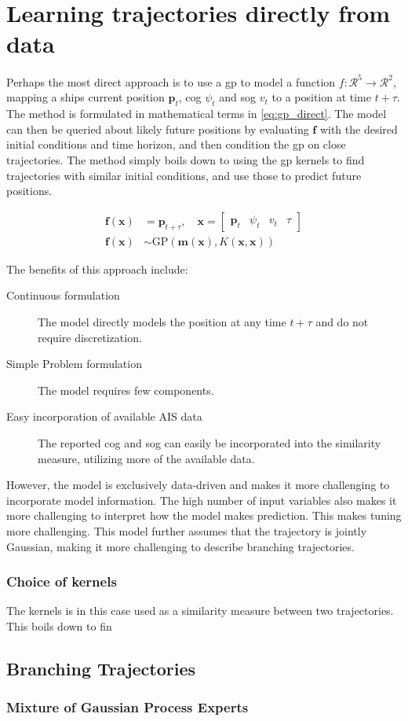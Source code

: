 \chapter{Learning trajectories directly from data}
Perhaps the most direct approach is to use a \acrshort{gp} to model a function $f: \mathcal{R}^5 \to \mathcal{R}^2$, mapping a ships current position $\boldsymbol{p}_t$, \acrshort{cog} $\psi_t$ and \acrshort{sog} $v_t$ to a position at time $t+\tau$. The method is formulated in mathematical terms in \cref{eq:gp_direct}. The model can then be queried about likely future positions by evaluating $\boldsymbol{f}$ with the desired initial conditions and time horizon, and then condition the \acrshort{gp} on close trajectories. 
The method simply boils down to using the \acrshort{gp} kernels to find trajectories with similar initial conditions, and use those to predict future positions.

\begin{subequations}\label{eq:gp_direct}
\begin{align}
    \boldsymbol{f}(\boldsymbol{x}) &= \boldsymbol{p}_{t+\tau} \label{eq:gp_direct_f}, \quad \boldsymbol{x} = \begin{bmatrix} \boldsymbol{p}_t & \psi_t & v_t & \tau\end{bmatrix}\\
    \boldsymbol{f}(\boldsymbol{x}) &\sim \text{GP}(\boldsymbol{m}(\boldsymbol{x}), K(\boldsymbol{x}, \boldsymbol{x}))\label{eq:gp_direct_f_dist}
\end{align} 
\end{subequations}

The benefits of this approach include:
\begin{description}
    \item[Continuous formulation] The model directly models the position at any time $t+\tau$ and do not require discretization. 
    \item[Simple Problem formulation] The model requires few components.
    \item[Easy incorporation of available AIS data] The reported \acrshort{cog} and \acrshort{sog} can easily be incorporated into the similarity measure, utilizing more of the available data.
\end{description}

However, the model is exclusively data-driven and makes it more challenging to incorporate model information. The high number of input variables also makes it more challenging to interpret how the model makes prediction. This makes tuning more challenging. This model further assumes that the trajectory is jointly Gaussian, making it more challenging to describe branching trajectories.

\subsection{Choice of kernels}
The kernels is in this case used as a similarity measure between two trajectories. This boils down to fin




\section{Branching Trajectories}


\subsection{Mixture of Gaussian Process Experts}

